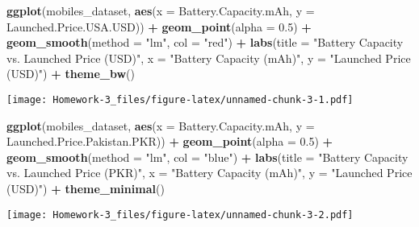 \documentclass[
]{article}
\newenvironment{Shaded}{\begin{snugshade}}{\end{snugshade}}
\newcommand{\AttributeTok}[1]{\textcolor[rgb]{0.13,0.29,0.53}{#1}}
\newcommand{\FloatTok}[1]{\textcolor[rgb]{0.00,0.00,0.81}{#1}}
\newcommand{\FunctionTok}[1]{\textcolor[rgb]{0.13,0.29,0.53}{\textbf{#1}}}
\newcommand{\NormalTok}[1]{#1}
\newcommand{\SpecialCharTok}[1]{\textcolor[rgb]{0.81,0.36,0.00}{\textbf{#1}}}
\newcommand{\StringTok}[1]{\textcolor[rgb]{0.31,0.60,0.02}{#1}}
\begin{document}
\begin{Shaded}
\begin{Highlighting}[]
\FunctionTok{ggplot}\NormalTok{(mobiles\_dataset, }\FunctionTok{aes}\NormalTok{(}\AttributeTok{x =}\NormalTok{ Battery.Capacity.mAh, }\AttributeTok{y =}\NormalTok{ Launched.Price.USA.USD)) }\SpecialCharTok{+}
  \FunctionTok{geom\_point}\NormalTok{(}\AttributeTok{alpha =} \FloatTok{0.5}\NormalTok{) }\SpecialCharTok{+}
  \FunctionTok{geom\_smooth}\NormalTok{(}\AttributeTok{method =} \StringTok{"lm"}\NormalTok{, }\AttributeTok{col =} \StringTok{"red"}\NormalTok{) }\SpecialCharTok{+}
  \FunctionTok{labs}\NormalTok{(}\AttributeTok{title =} \StringTok{"Battery Capacity vs. Launched Price (USD)"}\NormalTok{,}
       \AttributeTok{x =} \StringTok{"Battery Capacity (mAh)"}\NormalTok{,}
       \AttributeTok{y =} \StringTok{"Launched Price (USD)"}\NormalTok{) }\SpecialCharTok{+}
  \FunctionTok{theme\_bw}\NormalTok{()}
\end{Highlighting}
\end{Shaded}

\texttt{[image: Homework-3\_files/figure-latex/unnamed-chunk-3-1.pdf]}

\begin{Shaded}
\begin{Highlighting}[]
\FunctionTok{ggplot}\NormalTok{(mobiles\_dataset, }\FunctionTok{aes}\NormalTok{(}\AttributeTok{x =}\NormalTok{ Battery.Capacity.mAh, }\AttributeTok{y =}\NormalTok{ Launched.Price.Pakistan.PKR)) }\SpecialCharTok{+}
  \FunctionTok{geom\_point}\NormalTok{(}\AttributeTok{alpha =} \FloatTok{0.5}\NormalTok{) }\SpecialCharTok{+}
  \FunctionTok{geom\_smooth}\NormalTok{(}\AttributeTok{method =} \StringTok{"lm"}\NormalTok{, }\AttributeTok{col =} \StringTok{"blue"}\NormalTok{) }\SpecialCharTok{+}
  \FunctionTok{labs}\NormalTok{(}\AttributeTok{title =} \StringTok{"Battery Capacity vs. Launched Price (PKR)"}\NormalTok{,}
       \AttributeTok{x =} \StringTok{"Battery Capacity (mAh)"}\NormalTok{,}
       \AttributeTok{y =} \StringTok{"Launched Price (USD)"}\NormalTok{) }\SpecialCharTok{+}
  \FunctionTok{theme\_minimal}\NormalTok{()}
\end{Highlighting}
\end{Shaded}

\texttt{[image: Homework-3\_files/figure-latex/unnamed-chunk-3-2.pdf]}
\end{document}
